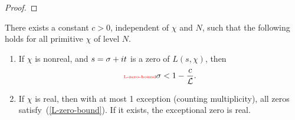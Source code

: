 \begin{proof}
\end{proof}
\begin{thm}
There exists a constant $c>0$, independent of $\chi$ and $N$, such that the following holds for all primitive $\chi$ of level $N$.
\begin{enumerate}
\item
If $\chi$ is nonreal, and $s=\sigma+it$ is a zero of $L(s,\chi)$, then
\begin{equation}\llabel{L-zero-bound}
\si<1-\frac{c}{\cal L}.
\end{equation}
\item
If $\chi$ is real, then with at most 1 exception (counting multiplicity), all zeros satisfy~(\ref{L-zero-bound}). If it exists, the exceptional zero is real.
\end{enumerate}
\end{thm}
